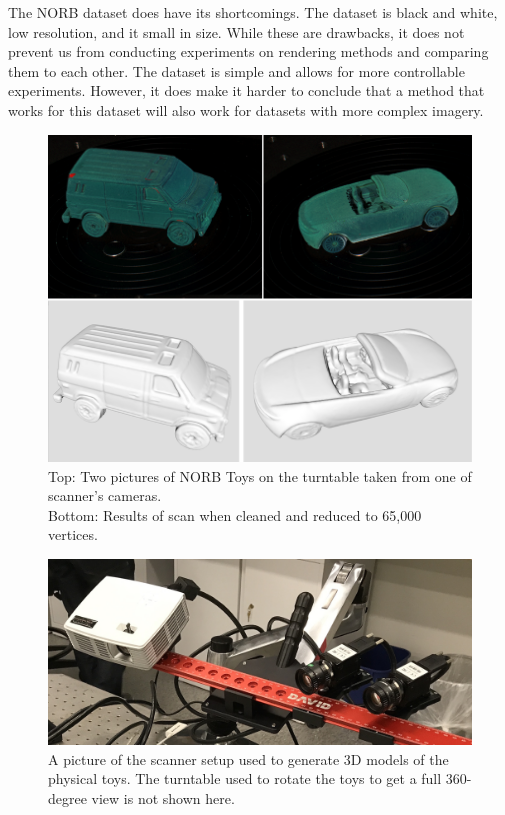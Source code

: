 \documentclass[10pt,twocolumn,letterpaper]{article}
\begin{document}
The NORB dataset does have its shortcomings. The dataset is black and white, low resolution, and it small in size. While these are drawbacks, it does not prevent us from conducting experiments on rendering methods and comparing them to each other.  The dataset is simple and allows for more controllable experiments.  However, it does make it harder to conclude that a method that works for this dataset will also work for datasets with more complex imagery.



\begin{figure}[h!]
\centering
\includegraphics[width=0.8\linewidth]{./assets/ToysScannerAndScan.png}
\caption{Top: Two pictures of NORB Toys on the turntable taken from one of scanner's cameras.\\ Bottom: Results of scan when cleaned and reduced to 65,000 vertices.}
\label{fig:norbscans}
\end{figure}

\begin{figure}[h!]
\centering
\includegraphics[width=0.8\columnwidth]{./assets/david_scanner.JPG}
\caption{A picture of the scanner setup used to generate 3D models of the physical toys. The turntable used to rotate the toys to get a full 360-degree view is not shown here.}
\label{fig:david}
\end{figure}
\end{document}
